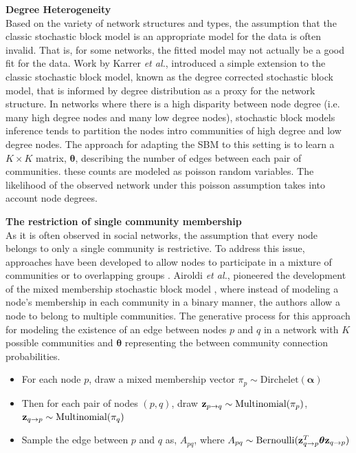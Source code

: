 {\bf Degree Heterogeneity}\\
\indent Based on the variety of network structures and types, the assumption that the classic stochastic block model is an appropriate model for the data is often invalid. That is, for some networks, the fitted model may not actually be a good fit for the data. Work by Karrer \emph{et al.}, introduced a simple extension to the classic stochastic block model, known as the degree corrected stochastic block model, that is informed by degree distribution as a proxy for the network structure. In networks where there is a high disparity between node degree (i.e. many high degree nodes and many low degree nodes), stochastic block models inference tends to partition the nodes intro communities of high degree and low degree nodes. The approach for adapting the SBM to this setting is to learn a $K \times K$ matrix, ${\boldsymbol \theta}$, describing the number of edges between each pair of communities. these counts are modeled as poisson random variables. The likelihood of the observed network under this poisson assumption takes into account node degrees. 

{\bf The restriction of single community membership}\\
\indent As it is often observed in social networks, the assumption that every node belongs to only a single community is restrictive. To address this issue, approaches have been developed to  allow nodes to  participate in a mixture of communities \cite{mixMember} or to overlapping groups \cite{LA}. Airoldi \emph{et al.}, pioneered the development of the mixed membership stochastic block model \cite{mixMember}, where instead of modeling a node's membership in each community in a binary manner, the authors allow a node to belong to multiple communities. The generative process for this approach for modeling the existence of an edge between nodes $p$ and $q$ in a network with $K$ possible communities and ${\boldsymbol \theta}$ representing the between community connection probabilities.

\begin{itemize}
\item For each node $p$, draw a mixed membership vector $\pi_{p}\sim \text{Dirchelet}({\boldsymbol \alpha})$
\item Then for each pair of nodes $(p,q)$, draw ${\bf z}_{p\rightarrow q} \sim \text{Multinomial}(\pi_{p})$, ${\bf z}_{q\rightarrow p} \sim \text{Multinomial}(\pi_{q})$
\item Sample the edge between $p$ and $q$ as, $A_{pq}$, where $A_{pq} \sim \text{Bernoulli}({\bf z}_{q\rightarrow p}^{T}{\boldsymbol \theta}{\bf z}_{q\rightarrow p})$
\end{itemize} 

